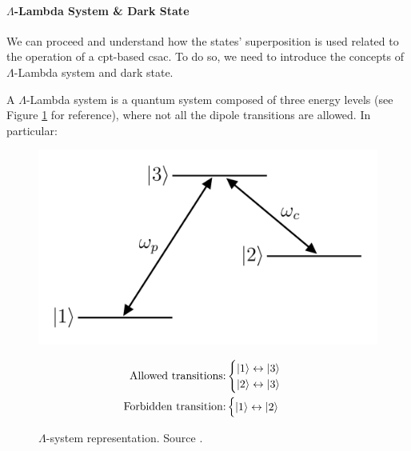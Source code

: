 \paragraph{$\Lambda$-Lambda System \& Dark State}

We can proceed and understand how the states' superposition is used related to the operation of a \acrshort{cpt}-based \acrshort{csac}.
To do so, we need to introduce the concepts of $\Lambda$-Lambda system and dark state.

A $\Lambda$-Lambda system is a quantum system composed of three energy levels (see Figure \ref{fig:lambda-system} for reference), where not all the dipole transitions are allowed.
In particular:

\begin{figure}[H]
    \centering

    \begin{minipage}[c]{0.49\linewidth}
        \centering
        \includegraphics[width=\textwidth, max width=\linewidth]{pdf/lambda-system.pdf}
        \caption{$\Lambda$-system representation. Source \cite{LambdaSystem}.}
        \label{fig:lambda-system}
    \end{minipage}
    \hfill
    \begin{minipage}[c]{0.49\linewidth}
        \begin{align}
            \text{Allowed transitions:}  & \begin{cases}
                                               \ket{1} \leftrightarrow \ket{3} \\
                                               \ket{2} \leftrightarrow \ket{3}
                                           \end{cases} \\
            \text{Forbidden transition:} & \begin{cases}
                                               \ket{1} \leftrightarrow \ket{2}
                                           \end{cases}
        \end{align}
    \end{minipage}

\end{figure}


